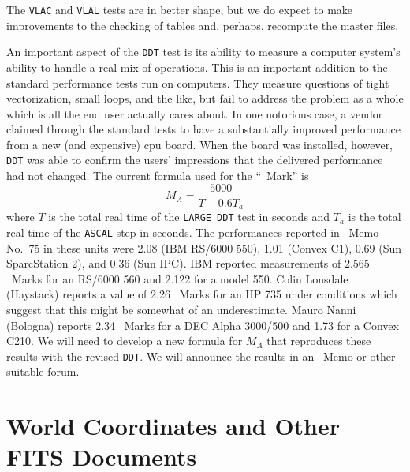 The {\tt VLAC} and {\tt VLAL} tests are in better shape, but we do
expect to make improvements to the checking of tables and, perhaps,
recompute the master files.

An important aspect of the {\tt DDT} test is its ability to measure a
computer system's ability to handle a real mix of operations.  This is
an important addition to the standard performance tests run on
computers.  They measure questions of tight vectorization, small
loops, and the like, but fail to address the problem as a whole which
is all the end user actually cares about.  In one notorious case, a
vendor claimed through the standard tests to have a substantially
improved performance from a new (and expensive) cpu board.  When the
board was installed, however, {\tt DDT} was able to confirm the users'
impressions that the delivered performance had not changed.  The
current formula used for the ``\AIPS\ Mark'' is
$$
         M_A = \frac{5000}{T - 0.6 T_a}
$$
where $T$ is the total real time of the {\tt LARGE DDT} test in
seconds and $T_a$ is the total real time of the {\tt ASCAL} step in
seconds.  The performances reported in \AIPS\ Memo No.~75 in these
units were 2.08 (IBM RS/6000 550), 1.01 (Convex C1), 0.69 (Sun
SparcStation 2), and 0.36 (Sun IPC).  IBM reported measurements of
2.565 \AIPS\ Marks for an RS/6000 560 and 2.122 for a model 550.
Colin Lonsdale (Haystack) reports a value of 2.26 \AIPS\ Marks for an
HP 735 under conditions which suggest that this might be somewhat of
an underestimate.  Mauro Nanni (Bologna) reports 2.34 \AIPS\ Marks for
a DEC Alpha 3000/500 and 1.73 for a Convex C210.  We will need to
develop a new formula for $M_A$ that reproduces these results with the
revised \hbox{{\tt DDT}}.  We will announce the results in an \AIPS\
Memo or other suitable forum.

\section{World Coordinates and Other FITS Documents}


